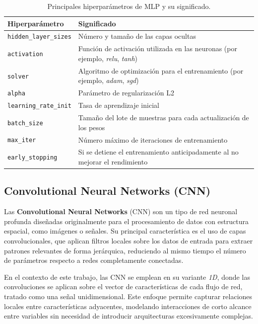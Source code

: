 \begin{table}[H]
    \centering
    \caption{Principales hiperparámetros de MLP y su significado.}
    \label{tab:mlp_hyperparams}
    \begin{tabular}{ll}
        \toprule
        \textbf{Hiperparámetro} & \textbf{Significado} \\
        \midrule
        \texttt{hidden\_layer\_sizes} & Número y tamaño de las capas ocultas \\
        \texttt{activation} & Función de activación utilizada en las neuronas (por ejemplo, \textit{relu}, \textit{tanh}) \\
        \texttt{solver} & Algoritmo de optimización para el entrenamiento (por ejemplo, \textit{adam}, \textit{sgd}) \\
        \texttt{alpha} & Parámetro de regularización L2 \\
        \texttt{learning\_rate\_init} & Tasa de aprendizaje inicial \\
        \texttt{batch\_size} & Tamaño del lote de muestras para cada actualización de los pesos \\
        \texttt{max\_iter} & Número máximo de iteraciones de entrenamiento \\
        \texttt{early\_stopping} & Si se detiene el entrenamiento anticipadamente al no mejorar el rendimiento \\
        \bottomrule
    \end{tabular}
\end{table}

\subsection{Convolutional Neural Networks (CNN)}

Las \textbf{Convolutional Neural Networks} (CNN) son un tipo de red neuronal profunda diseñadas originalmente para el procesamiento de datos con estructura espacial, como imágenes o señales. Su principal característica es el uso de capas convolucionales, que aplican filtros locales sobre los datos de entrada para extraer patrones relevantes de forma jerárquica, reduciendo al mismo tiempo el número de parámetros respecto a redes completamente conectadas.

En el contexto de este trabajo, las CNN se emplean en su variante \textit{1D}, donde las convoluciones se aplican sobre el vector de características de cada flujo de red, tratado como una señal unidimensional. Este enfoque permite capturar relaciones locales entre características adyacentes, modelando interacciones de corto alcance entre variables sin necesidad de introducir arquitecturas excesivamente complejas.

